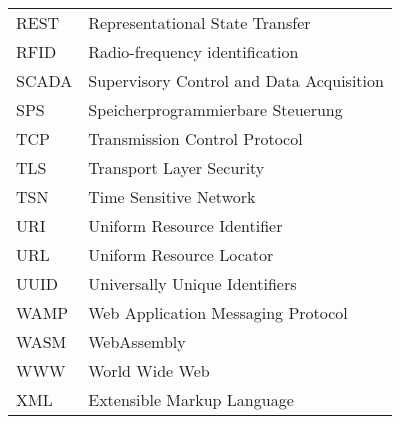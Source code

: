 \begin{tabular}{@{}l@{\qquad}l}
  REST  & Representational State Transfer\\
  RFID  & Radio-frequency identification\\
  SCADA & Supervisory Control and Data Acquisition\\
  SPS   & Speicherprogrammierbare Steuerung\\
  TCP   & Transmission Control Protocol\\
  TLS   & Transport Layer Security\\
  TSN   & Time Sensitive Network\\
  URI   & Uniform Resource Identifier\\
  URL   & Uniform Resource Locator\\
  UUID  & Universally Unique Identifiers\\
  WAMP  & Web Application Messaging Protocol\\
  WASM  & WebAssembly\\
  WWW   & World Wide Web\\
  XML   & Extensible Markup Language
\end{tabular}
